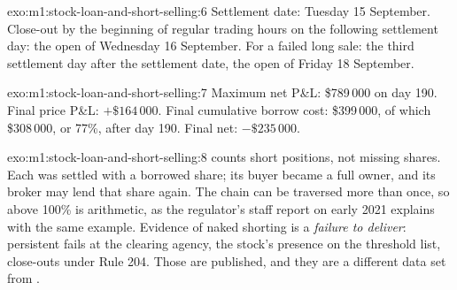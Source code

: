 \begin{solution}{exo:m1:stock-loan-and-short-selling:6}
Settlement date: Tuesday 15 September. Close-out by the beginning of regular
trading hours on the following settlement day: the open of Wednesday 16
September. For a failed long sale: the third settlement day after the
settlement date, the open of Friday 18 September.
\end{solution}

\begin{solution}{exo:m1:stock-loan-and-short-selling:7}
Maximum net P\&L: \$789\,000 on day 190. Final price P\&L: $+\$164\,000$. Final
cumulative borrow cost: \$399\,000, of which \$308\,000, or 77\%, after day
190. Final net: $-\$235\,000$.
\end{solution}

\begin{solution}{exo:m1:stock-loan-and-short-selling:8}
 counts short positions, not missing shares. Each 
was settled with a borrowed share; its buyer became a full owner, and its
broker may lend that share again. The chain can be traversed more than once,
so  above 100\% is arithmetic, as the regulator's staff report
on early 2021 explains with the same example. Evidence of naked shorting is
a \emph{failure to deliver}: persistent fails at the clearing agency, the
stock's presence on the threshold list, close-outs under Rule 204. Those are
published, and they are a different data set from .
\end{solution}

